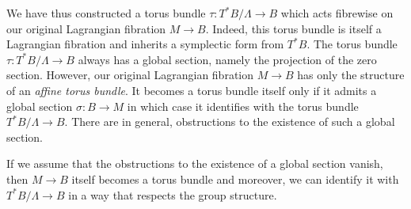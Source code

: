 \begin{remark}
    We have thus constructed a torus bundle $\tau : T^*B/\Lambda \to B$ which acts fibrewise on our original Lagrangian fibration $M \to B$. Indeed, this torus bundle is itself a Lagrangian fibration
    and inherits a symplectic form from $T^*B$. The torus bundle
    $\tau : T^*B/\Lambda \to B$ always has a global section, namely the projection of the zero section. However, our original Lagrangian fibration
    $M \to B$ has only the structure of an \emph{affine torus bundle}. It becomes a torus bundle itself only if it admits a global section $\sigma: B \to M$ in which case
    it identifies with the torus bundle $T^*B/\Lambda \to B$. There are in general, obstructions to the existence of such a global section.
\end{remark}

If we assume that the obstructions to the existence of a global section vanish,
then $M \to B$ itself becomes a torus bundle and moreover, we can identify it
with $T^*B/\Lambda \to B$ in a way that respects the group structure.

